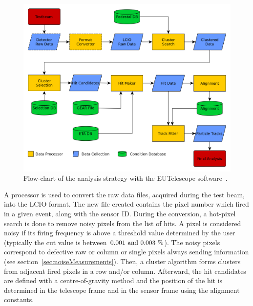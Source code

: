     \begin{figure}[!tbh]
      \centering
      \includegraphics[width = \textwidth]{Pictures/X0/eutel-strategy.png}
      \caption{Flow-chart of the analysis strategy with the EUTelescope software~\cite{EUTelFlowChart}.}
      \label{fig:eutel-strategy}
    \end{figure}

    A processor is used to convert the raw data files, acquired during the test beam, into the LCIO format.
    The new file created contains the pixel number which fired in a given event, along with the sensor ID.
    During the conversion, a hot-pixel search is done to remove noisy pixels from the list of hits.
    A pixel is considered noisy if its firing frequency is above a threshold value determined by the user (typically the cut value is between $0.001~\rm{and}~0.003~\%$).
    The noisy pixels correspond to defective raw or column or single pixels always sending information (see section~\ref{sec:noiseMeasurements}).
    Then, a cluster algorithm forms clusters from adjacent fired pixels in a row and/or column.
    Afterward, the hit candidates are defined with a centre-of-gravity method and the position of the hit is determined in the telescope frame and in the sensor frame using the alignment constants.

